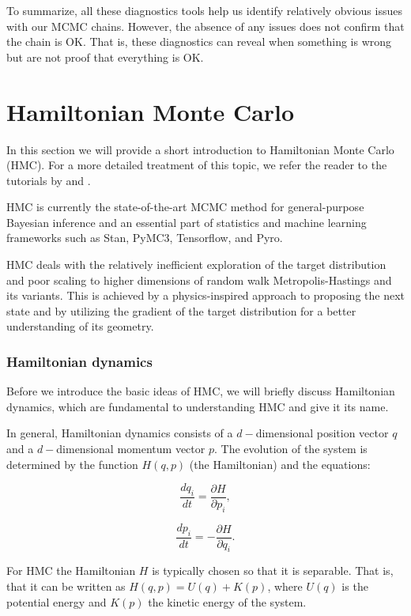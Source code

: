\documentclass{book}
\theoremstyle{plain}%
\theoremstyle{definition}
\begin{document}
To summarize, all these diagnostics tools help us identify relatively obvious issues with our MCMC chains. However, the absence of any issues does not confirm that the chain is OK. That is, these diagnostics can reveal when something is wrong but are not proof that everything is OK.

\section{Hamiltonian Monte Carlo}

In this section we will provide a short introduction to Hamiltonian Monte Carlo (HMC). For a more detailed treatment of this topic, we refer the reader to the tutorials by \cite{Neal2011} and  \cite{Betancourt2017}.

HMC is currently the state-of-the-art MCMC method for general-purpose Bayesian inference and an essential part of statistics and machine learning frameworks such as Stan, PyMC3, Tensorflow, and Pyro. 

HMC deals with the relatively inefficient exploration of the target distribution and poor scaling to higher dimensions of random walk Metropolis-Hastings and its variants. This is achieved by a physics-inspired approach to proposing the next state and by utilizing the gradient of the target distribution for a better understanding of its geometry.

\subsubsection*{Hamiltonian dynamics}

Before we introduce the basic ideas of HMC, we will briefly discuss Hamiltonian dynamics, which are fundamental to understanding HMC and give it its name.

In general, Hamiltonian dynamics consists of a $d-$dimensional position vector $q$ and a $d-$dimensional momentum vector $p$. The evolution of the system is determined by the function $H(q, p)$ (the Hamiltonian) and the equations:

$$\frac{dq_i}{dt} = \frac{\partial H}{\partial p_i},$$

$$\frac{dp_i}{dt} = -\frac{\partial H}{\partial q_i}.$$

For HMC the Hamiltonian $H$ is typically chosen so that it is separable. That is, that it can be written as $H(q,p) = U(q) + K(p)$, where $U(q)$ is the potential energy and $K(p)$ the kinetic energy of the system.
\end{document}

